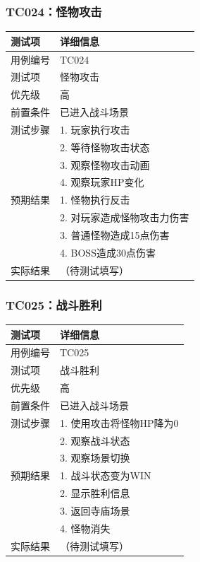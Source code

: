 \documentclass[a4paper,12pt]{article}
\begin{document}
\subsubsection{TC024：怪物攻击}
\begin{table}[h]
\centering
\begin{tabular}{ll}
\toprule
测试项 & 详细信息 \\
\midrule
用例编号 & TC024 \\
测试项 & 怪物攻击 \\
优先级 & 高 \\
前置条件 & 已进入战斗场景 \\
测试步骤 & 1. 玩家执行攻击 \\
 & 2. 等待怪物攻击状态 \\
 & 3. 观察怪物攻击动画 \\
 & 4. 观察玩家HP变化 \\
预期结果 & 1. 怪物执行反击 \\
 & 2. 对玩家造成怪物攻击力伤害 \\
 & 3. 普通怪物造成15点伤害 \\
 & 4. BOSS造成30点伤害 \\
实际结果 & （待测试填写） \\
\bottomrule
\end{tabular}
\end{table}

\subsubsection{TC025：战斗胜利}
\begin{table}[h]
\centering
\begin{tabular}{ll}
\toprule
测试项 & 详细信息 \\
\midrule
用例编号 & TC025 \\
测试项 & 战斗胜利 \\
优先级 & 高 \\
前置条件 & 已进入战斗场景 \\
测试步骤 & 1. 使用攻击将怪物HP降为0 \\
 & 2. 观察战斗状态 \\
 & 3. 观察场景切换 \\
预期结果 & 1. 战斗状态变为WIN \\
 & 2. 显示胜利信息 \\
 & 3. 返回寺庙场景 \\
 & 4. 怪物消失 \\
实际结果 & （待测试填写） \\
\bottomrule
\end{tabular}
\end{table}
\end{document}

